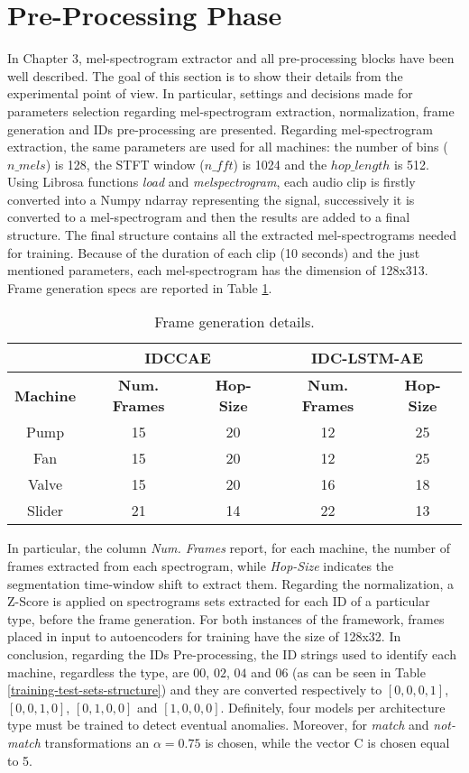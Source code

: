\section{Pre-Processing Phase}
In Chapter 3, mel-spectrogram extractor and all pre-processing blocks have been well described. The goal of this section is to show their details from the experimental point of view. In particular, settings and decisions made for parameters selection regarding mel-spectrogram extraction, normalization, frame generation and IDs pre-processing are presented. Regarding mel-spectrogram extraction, the same parameters are used for all machines: the number of bins ($n\_mels$) is 128, the STFT window ($n\_fft$) is 1024 and the $hop\_length$ is 512. Using Librosa functions \textit{load} and \textit{melspectrogram}, each audio clip is firstly converted into a Numpy ndarray representing the signal, successively it is converted to a mel-spectrogram and then the results are added to a final structure. The final structure contains all the extracted mel-spectrograms needed for training. Because of the duration of each clip (10 seconds) and the just mentioned parameters, each mel-spectrogram has the dimension of 128x313. Frame generation specs are reported in Table \ref{frame-generation}.\\
\begin{table}[ht]
\centering
\begin{tabular}{|c|c|c|c|c|} 
\cline{2-5}
\multicolumn{1}{c|}{} & \multicolumn{2}{c|}{\textbf{IDCCAE}} & \multicolumn{2}{c|}{\textbf{IDC-LSTM-AE}} \\ 
\hline
\textbf{Machine} & \textbf{Num. Frames} & \textbf{Hop-Size} & \textbf{Num. Frames} & \textbf{Hop-Size} \\ 
\hline
Pump & 15 & 20 & 12 & 25  \\ 
\hline
Fan & 15 & 20 & 12 & 25  \\ 
\hline
Valve & 15 & 20 & 16 & 18  \\ 
\hline
Slider & 21 & 14 & 22 & 13  \\
\hline
\end{tabular}
\caption{Frame generation details.}
\label{frame-generation}
\end{table}

In particular, the column \textit{Num. Frames} report, for each machine, the number of frames extracted from each spectrogram, while \textit{Hop-Size} indicates the segmentation time-window shift to extract them. Regarding the normalization, a Z-Score is applied on spectrograms sets extracted for each ID of a particular type, before the frame generation. For both instances of the framework, frames placed in input to autoencoders for training have the size of 128x32. In conclusion, regarding the IDs Pre-processing, the ID strings used to identify each machine, regardless the type, are $00$, $02$, $04$ and $06$ (as can be seen in Table \ref{training-test-sets-structure}) and they are converted respectively to $[0,0,0,1]$, $[0,0,1,0]$, $[0,1,0,0]$ and $[1,0,0,0]$. Definitely, four models per architecture type must be trained to detect eventual anomalies. Moreover, for \textit{match} and \textit{not-match} transformations an $\alpha=0.75$ is chosen, while the vector C is chosen equal to 5.

